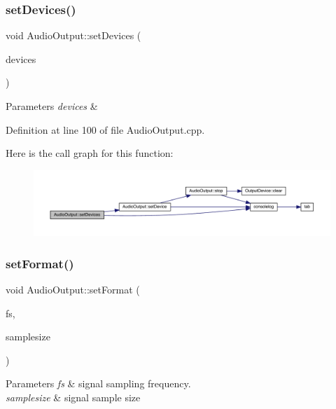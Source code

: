 \subsubsection{\texorpdfstring{set\+Devices()}{setDevices()}}
{\footnotesize\ttfamily void Audio\+Output\+::set\+Devices (\begin{DoxyParamCaption}\item[{Q\+List$<$ Q\+Audio\+Device\+Info $>$}]{devices }\end{DoxyParamCaption})}


\begin{DoxyParams}{Parameters}
{\em devices} & \\
\hline
\end{DoxyParams}


Definition at line 100 of file Audio\+Output.\+cpp.

Here is the call graph for this function\+:
\nopagebreak
\begin{figure}[H]
\begin{center}
\leavevmode
\includegraphics[width=350pt]{class_audio_output_a27ada29ff74a99f5c21d949caba261ee_cgraph}
\end{center}
\end{figure}
\mbox{\label{class_audio_output_a467f6e31cf89b89e9986caa05ec7fe62}} 
\subsubsection{\texorpdfstring{set\+Format()}{setFormat()}}
{\footnotesize\ttfamily void Audio\+Output\+::set\+Format (\begin{DoxyParamCaption}\item[{int}]{fs,  }\item[{int}]{samplesize }\end{DoxyParamCaption})}


\begin{DoxyParams}{Parameters}
{\em fs} & signal sampling frequency. \\
\hline
{\em samplesize} & signal sample size \\
\hline
\end{DoxyParams}


